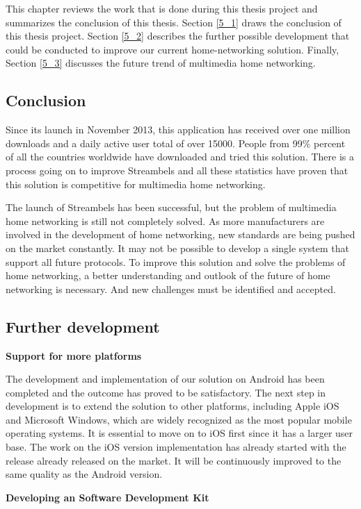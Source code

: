 This chapter reviews the work that is done during this thesis project and
summarizes the conclusion of this thesis. Section \ref{5_1} draws the
conclusion of this thesis project. Section \ref{5_2} describes the further
possible development that could be conducted to improve our current
home-networking solution. Finally, Section \ref{5_3} discusses the future trend
of multimedia home networking.
\subsection{Conclusion\label{5_1}}
Since its launch in November 2013, this application has received over one
million downloads and a daily active user total of over 15000. People from 99\%
percent of all the countries worldwide have downloaded and tried this solution.
There is a process going on to improve Streambels and all these
statistics have proven that this solution is competitive for multimedia home
networking.

The launch of Streambels has been successful, but the problem of multimedia
 home networking is still not completely solved. As more manufacturers are
 involved in the development of home networking, new standards are being pushed
 on the market constantly. It may not be possible to develop a single
 system that support all future protocols. To improve this solution and solve
 the problems of home networking, a better understanding and outlook of the
 future of home networking is necessary. And new challenges must be identified
 and accepted.

\subsection{Further development\label{5_2}}
\textbf{Support for more platforms}

The development and implementation of our solution on Android has been completed
and the outcome has proved to be satisfactory. The next step in development is
to extend the solution to other platforms, including Apple iOS and Microsoft
Windows, which are widely recognized as the most popular mobile operating
systems. It is essential to move on to iOS first since it has a larger user
base. The work on the iOS version implementation has already started with the
release already released on the market. It will be continuously improved to
the same quality as the Android version.

\textbf{Developing an Software Development Kit}

